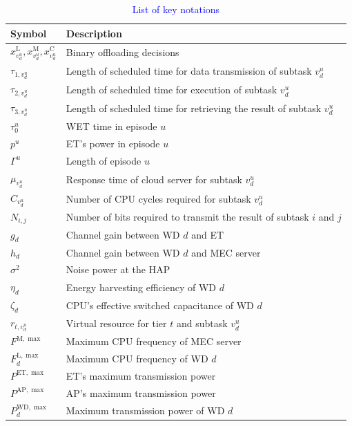 \documentclass[12pt,draftclsnofoot,onecolumn]{IEEEtran}
\newcommand{\rev}[1]{{\color{blue}#1}} %
\newcommand{\rev}[1]{#1}
\newenvironment{my}[2]%
{\begin{list}{}%
{\setlength{\rightmargin}{#1}\setlength{\leftmargin}{#2}}%


 \item[]{}

} {\end{list}}
\begin{document}
\begin{enumerate}
\begin{my}{1cm}{1cm}
	\rev{		\begin{table}[h]
			\centering
			\caption{\textcolor{blue}{List of key notations}}
			\label{table3}
			{\color{blue}\begin{tabular}{ |p{2cm}|p{12cm}|  }
				\hline
				\textbf{Symbol} & \textbf{Description} \\
				\hline
				$x^{\text{L}}_{v_d^u}, x^{\text{M}}_{v_d^u}, x^{\text{C}}_{v_d^u}$ & Binary offloading decisions \\
				$\tau_{1,v_d^u}$ & Length of scheduled time for data transmission of subtask $v_d^u$ \\
				$\tau_{2,v_d^u}$ & Length of scheduled time for execution of subtask $v_d^u$\\
				$\tau_{3,v_d^u}$ & Length of scheduled time for retrieving the result of subtask $v_d^u$ \\
				$\tau_0^u$ & WET time in episode $u$\\
				$p^{u}$ & ET's power in episode $u$ \\
				$\Gamma^u$ & Length of episode $u$ \\
				$\mu_{v_d^u}$ & Response time of cloud server for subtask $v_d^u$ \\
				$C_{v_d^u}$ & Number of CPU cycles required for subtask $v_d^u$ \\
				$N_{i,j}$ & Number of bits required to transmit the result of subtask $i$ and $j$ \\
				$g_d$ & Channel gain between WD $d$ and ET \\
				$h_d$ & Channel gain between WD $d$ and MEC server \\
				$\sigma^2$ & Noise power at the HAP \\
				$\eta_d$ & Energy harvesting efficiency of WD $d$ \\
				$\zeta_{d}$ & CPU's effective switched capacitance of WD $d$ \\
				$r_{t,v_d^u}$ & Virtual resource for tier $t$ and subtask $v_d^u$ \\
				$F^{\text{M},\max}$ & Maximum CPU frequency of MEC server \\
				$F^{\text{L},\max}_{d}$ & Maximum CPU frequency of WD $d$ \\
				$P^{\text{ET},\max}$ & ET's maximum transmission power \\
				$P^{\text{AP},\max}$ & AP's maximum transmission power \\
				$P^{\text{WD},\max}_d$ & Maximum transmission power of WD $d$ \\

\end{tabular}}
\end{table}}
\end{my}
\end{enumerate}
\end{document}
